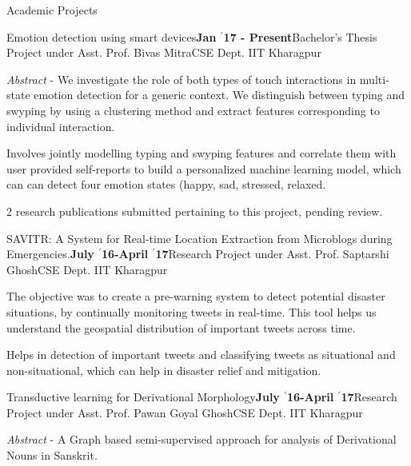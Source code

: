 \documentclass{resume} %
\begin{document}
\begin{rSection}{Academic Projects}

\begin{rSubsection}{ \large Emotion detection using smart devices}{\textbf{\large Jan $^{\prime}$17 - Present}}{Bachelor's Thesis Project under Asst. Prof. Bivas Mitra}{CSE Dept. IIT Kharagpur}
\item \textit{Abstract} - We investigate the role of both types of touch interactions in multi-state emotion detection for a generic context. We distinguish between typing and swyping by using a clustering method and extract features corresponding to individual interaction.

\item Involves jointly modelling typing and swyping features and correlate them with user provided self-reports to build a personalized machine learning model, which can can detect four emotion states (happy, sad, stressed, relaxed.

\item 2 research publications submitted pertaining to this project, pending review.
\end{rSubsection}

\begin{rSubsection}{ \large SAVITR: A System for Real-time Location Extraction from Microblogs during Emergencies.}{\textbf{\large July $^{\prime}$16-April $^{\prime}$17}}{Research Project under Asst. Prof. Saptarshi Ghosh}{CSE Dept. IIT Kharagpur}
\item The objective was to create a pre-warning system to detect potential disaster situations, by continually monitoring tweets in real-time. This tool helps us understand the geospatial distribution of important tweets across time.
\item Helps in detection of important tweets and classifying tweets as situational and non-situational, which can help in disaster relief and mitigation.
\end{rSubsection}

\begin{rSubsection}{ \large Transductive learning for Derivational Morphology}{\textbf{\large July $^{\prime}$16-April $^{\prime}$17}}{Research Project under Asst. Prof. Pawan Goyal Ghosh}{CSE Dept. IIT Kharagpur}
\item \textit{Abstract} - A Graph based semi-supervised approach for analysis of Derivational Nouns in Sanskrit.


\end{rSubsection}
\end{rSection}
\end{document}
